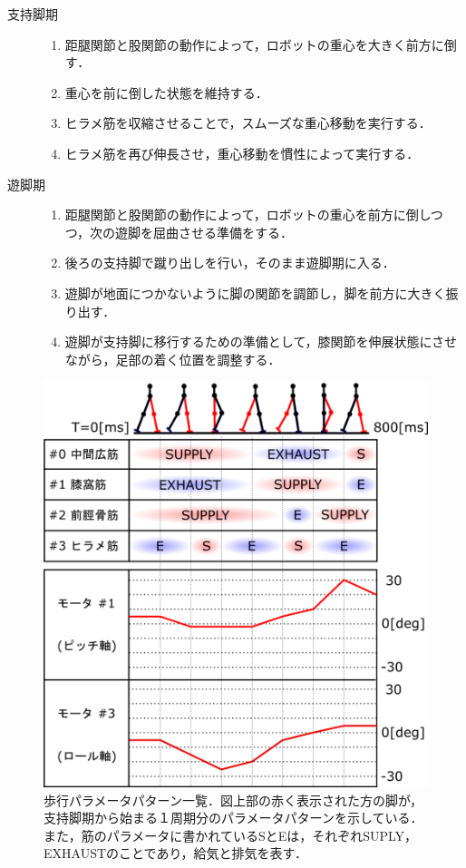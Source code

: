 \begin{description}
\item[支持脚期] \mbox{}
 \begin{enumerate}
  \item 距腿関節と股関節の動作によって，ロボットの重心を大きく前方に倒す．
  \item 重心を前に倒した状態を維持する．
  \item ヒラメ筋を収縮させることで，スムーズな重心移動を実行する．
  \item ヒラメ筋を再び伸長させ，重心移動を慣性によって実行する．
 \end{enumerate}
\item[遊脚期] \mbox{}
 \begin{enumerate}
  \item 距腿関節と股関節の動作によって，ロボットの重心を前方に倒しつつ，次の遊脚を屈曲させる準備をする．
  \item 後ろの支持脚で蹴り出しを行い，そのまま遊脚期に入る．
  \item 遊脚が地面につかないように脚の関節を調節し，脚を前方に大きく振り出す．
  \item 遊脚が支持脚に移行するための準備として，膝関節を伸展状態にさせながら，足部の着く位置を調整する．
 \end{enumerate}
\end{description}
	    
\begin{figure}[htbp]
 \centering
 \includegraphics[clip,width=12.0cm]{./fig/parameter_pattern.png}
    \caption{歩行パラメータパターン一覧．図上部の赤く表示された方の脚が，支持脚期から始まる１周期分のパラメータパターンを示している．また，筋のパラメータに書かれているSとEは，それぞれSUPLY，EXHAUSTのことであり，給気と排気を表す．\label{parameter}}
\end{figure}



